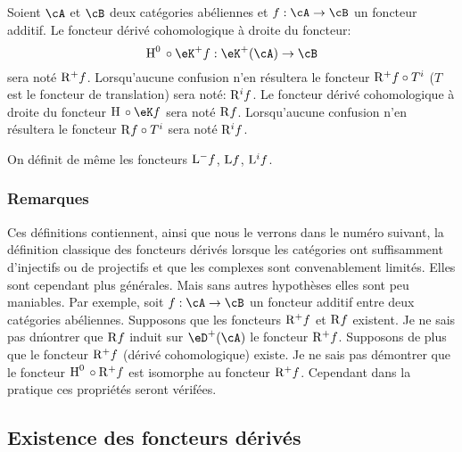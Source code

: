 Soient $\cA$ et $\cB$ deux catégories abéliennes et $f:\cA\to \cB$ un 
foncteur additif. Le foncteur dérivé cohomologique à droite du foncteur: 
\[
  \h^0{}\circ \eK^+ f:\eK^+(\cA) \to \cB 
\]
sera noté $\mathrm{R}^+ f$. Lorsqu'aucune confusion n'en résultera le foncteur 
$\mathrm{R}^+ f\circ T^i$ ($T$ est le foncteur de translation) sera noté: 
$\mathrm{R}^i f$. Le foncteur dérivé cohomologique à droite du foncteur 
$\h{}\circ \eK f$ sera noté $\mathrm{R} f$. Lorsqu'aucune confusion n'en résultera 
le foncteur $\mathrm{R} f\circ T^i$ sera noté $\mathrm{R}^i f$. 

On définit de même les foncteurs $\mathrm{L}^- f$, $\mathrm{L} f$, $\mathrm{L}^i f$. 





\subsubsection{Remarques}\label{VIII:4-1-6}

Ces définitions contiennent, ainsi que nous le verrons dans le numéro 
suivant, la définition classique des foncteurs dérivés lorsque les 
catégories ont suffisamment d'injectifs ou de projectifs et que les complexes 
sont convenablement limités. Elles sont cependant plus générales. Mais 
sans autres hypothèses elles sont peu maniables. Par exemple, soit 
$f:\cA\to \cB$ un foncteur additif entre deux catégories abéliennes. 
Supposons que les foncteurs $\mathrm{R}^+ f$ et $\mathrm{R} f$ existent. Je ne sais pas 
d\'montrer que $\mathrm{R} f$ induit sur $\eD^+(\cA)$ le foncteur $\mathrm{R}^+ f$. Supposons 
de plus que le foncteur $\mathrm{R}^+ f$ (dérivé cohomologique) existe. Je ne sais 
pas démontrer que le foncteur $\operatorname{H}^0{}\circ \mathrm{R}^+ f$ est isomorphe au foncteur 
$\mathrm{R}^+ f$. Cependant dans la pratique ces propriétés seront vérifées. 










\subsection{Existence des foncteurs dérivés}\label{VIII:4-2}





